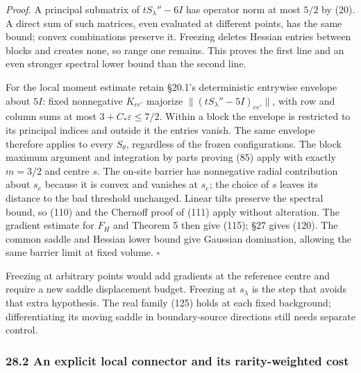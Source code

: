 \documentclass[11pt,a4paper]{article}
\begin{document}
\emph{Proof.} A principal submatrix of \(tS_\lambda''-6I\) has operator
norm at most \(5/2\) by (20). A direct sum of such matrices, even
evaluated at different points, has the same bound; convex combinations
preserve it. Freezing deletes Hessian entries between blocks and creates
none, so range one remains. This proves the first line and an even
stronger spectral lower bound than the second line.

For the local moment estimate retain §20.1's deterministic entrywise
envelope about \(5I\): fixed nonnegative \(K_{ee'}\) majorize
\(\|(tS_\lambda''-5I)_{ee'}\|\), with row and column sums at most
\(3+C_*\varepsilon\le7/2\). Within a block the envelope is restricted to
its principal indices and outside it the entries vanish. The same
envelope therefore applies to every \(S_\theta\), regardless of the
frozen configurations. The block maximum argument and integration by
parts proving (85) apply with exactly \(m=3/2\) and centre \(s\). The
on-site barrier has nonnegative radial contribution about \(s_e\)
because it is convex and vanishes at \(s_e\); the choice of \(s\) leaves
its distance to the bad threshold unchanged. Linear tilts preserve the
spectral bound, so (110) and the Chernoff proof of (111) apply without
alteration. The gradient estimate for \(F_H\) and Theorem 5 then give
(115); §27 gives (120). The common saddle and Hessian lower bound give
Gaussian domination, allowing the same barrier limit at fixed volume.
\(\square\)

Freezing at arbitrary points would add gradients at the reference centre
and require a new saddle displacement budget. Freezing at \(s_\lambda\)
is the step that avoids that extra hypothesis. The real family (125)
holds at each fixed background; differentiating its moving saddle in
boundary-source directions still needs separate control.

\hypertarget{an-explicit-local-connector-and-its-rarity-weighted-cost}{%
\subsubsection{28.2 An explicit local connector and its rarity-weighted
cost}\label{an-explicit-local-connector-and-its-rarity-weighted-cost}}
\end{document}
